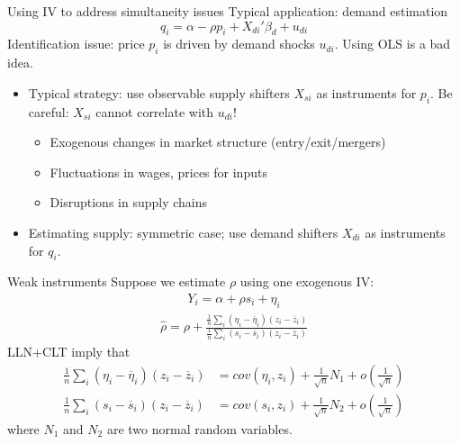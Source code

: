 \documentclass[pdftex]{beamer}
\begin{document}
\begin{frame}{Using IV to address simultaneity issues}
Typical application: demand estimation
\begin{equation}
	q_i = \alpha - \rho p_i + X_{di}'\beta_d + u_{di}
\end{equation}
Identification issue: price $p_i$ is driven by demand shocks $u_{di}$. Using OLS is a bad idea.
\begin{itemize}
	\item Typical strategy: use observable supply shifters $X_{si}$ as instruments for $p_i$. Be careful: $X_{si}$ cannot correlate with $u_{di}$!
	\begin{itemize}
		\item Exogenous changes in market structure (entry/exit/mergers)
		\item Fluctuations in wages, prices for inputs
		\item Disruptions in supply chains
	\end{itemize}
	\item Estimating supply: symmetric case; use demand shifters $X_{di}$ as instruments for $q_i$.
\end{itemize}
\end{frame}

\begin{frame}{Weak instruments}
Suppose we estimate $\rho$ using one exogenous IV:
\begin{eqnarray*}
	Y_{i} = \alpha+ \rho s_{i}+\eta_{i}
\end{eqnarray*}
\begin{align*}
	\widehat\rho=\rho + \frac{\frac{1}{n}\sum_i(\eta_{i} - \overline{\eta}_i)(z_{i} - \overline{z}_i)}{\frac{1}{n}\sum_i(s_{i} - \overline{s}_i)(z_{i} - \overline{z}_i)}
\end{align*}
LLN+CLT imply that
\begin{align*}
\frac{1}{n}\sum_i(\eta_{i} - \overline{\eta}_i)(z_{i} - \overline{z}_i) &= cov(\eta_i, z_i) + \frac{1}{\sqrt{n}}N_1 + o\left(\frac{1}{\sqrt{n}}\right)\\
\frac{1}{n}\sum_i(s_{i} - \overline{s}_i)(z_{i} - \overline{z}_i) &= cov(s_i, z_i) + \frac{1}{\sqrt{n}}N_2 + o\left(\frac{1}{\sqrt{n}}\right)
\end{align*}
where $N_1$ and $N_2$ are two normal random variables.
\end{frame}
\end{document}
